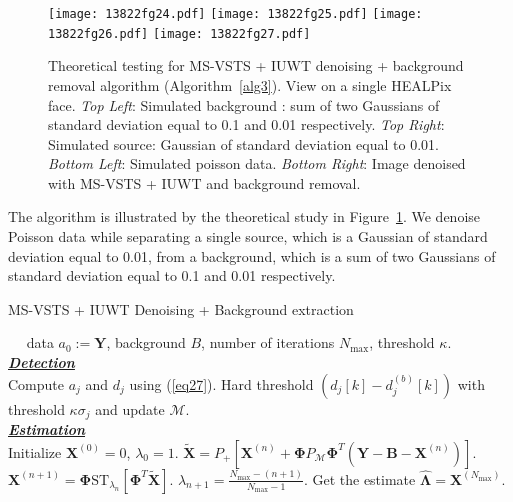 \begin{figure}[htb]
\begin{center}
\texttt{[image: 13822fg24.pdf]} \hfill
\texttt{[image: 13822fg25.pdf]} \hfill
\texttt{[image: 13822fg26.pdf]} \hfill
\texttt{[image: 13822fg27.pdf]}
\caption{Theoretical testing for MS-VSTS + IUWT denoising + background removal algorithm (Algorithm~\ref{alg3}). View on a single HEALPix face.
\emph{Top Left}: Simulated background : sum of two Gaussians of standard deviation equal to 0.1 and 0.01 respectively.
\emph{Top Right}: Simulated source: Gaussian of standard deviation equal to 0.01.
\emph{Bottom Left}: Simulated poisson data.
\emph{Bottom Right}: Image denoised with MS-VSTS + IUWT and background removal.
}
\label{background}
\end{center}
\end{figure}
The algorithm is illustrated by the theoretical study in Figure~\ref{background}. We denoise Poisson data while separating a single source, which is a Gaussian of standard deviation equal to 0.01, from a background, which is a sum of two Gaussians of standard deviation equal to 0.1 and 0.01 respectively. 

\begin{algorithm}
\caption{MS-VSTS + IUWT Denoising + Background extraction}
\label{alg3}

\begin{algorithmic}[1]
\REQUIRE $\quad$ data $a_0:=\mathbf{Y}$, background $B$, number of iterations $N_{\max}$, threshold $\kappa$. \\
\underline{\emph{\textbf{Detection}}} \\
\STATE Compute $a_j$ and $d_j$ using (\ref{eq27}).
\STATE Hard threshold $(d_j[k] - d^{(b)}_{j}[k])$ with threshold $\kappa \sigma_j$ and update $\mathcal{M}$.
\ENDFOR \\
\underline{\emph{\textbf{Estimation}}} \\
\STATE Initialize $\mathbf{X}^{(0)}=0$, $\lambda_0 = 1$.
\STATE $\tilde{\mathbf{X}}= P_{+}[\mathbf{ X}^{(n)} + \mathbf{ \Phi} P_{\mathcal{M}} \mathbf{ \Phi}^{T} (\mathbf{ Y} - \mathbf{B} - \mathbf{ X}^{(n)})]$.
\STATE $\mathbf{X}^{(n+1)} = \mathbf{ \Phi}\text{ST}_{\lambda_n}[\mathbf{ \Phi}^{T}\tilde{\mathbf{X}}]$.
\STATE $\lambda_{n+1} = \frac{N_{\max} - (n+1)}{N_{\max} - 1}$.
\ENDFOR
\STATE Get the estimate $\hat{\mathbf{\Lambda}} = \mathbf{X}^{(N_{\max})}$.
\end{algorithmic}
\end{algorithm}

